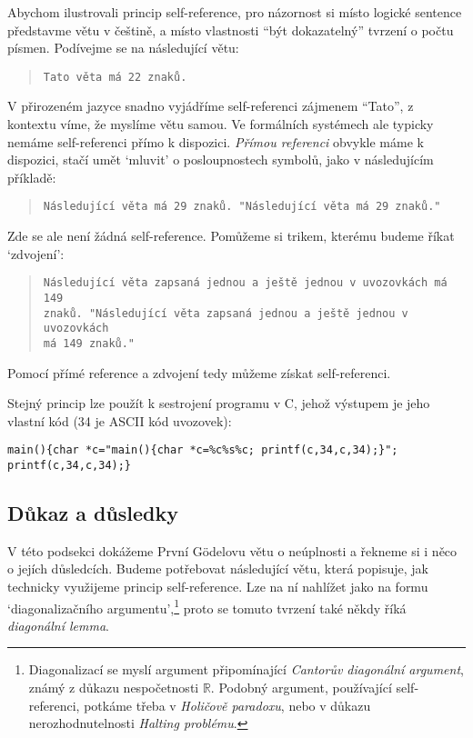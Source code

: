 Abychom ilustrovali princip self-reference, pro názornost si místo logické sentence představme větu v češtině, a místo vlastnosti ``být dokazatelný'' tvrzení o počtu písmen. Podívejme se na následující větu:
\begin{quote}
    \texttt{Tato věta má 22 znaků.}
\end{quote}
V přirozeném jazyce snadno vyjádříme self-referenci zájmenem ``Tato'', z kontextu víme, že myslíme větu samou. Ve formálních systémech ale typicky nemáme self-referenci přímo k dispozici. \emph{Přímou referenci} obvykle máme k dispozici, stačí umět `mluvit' o posloupnostech symbolů, jako v následujícím příkladě:
\begin{quote}
    \texttt{Následující věta má 29 znaků. "Následující věta má 29 znaků."}
\end{quote}
Zde se ale není žádná self-reference. Pomůžeme si trikem, kterému budeme říkat `zdvojení':
\begin{quote}
    \texttt{Následující věta zapsaná jednou a ještě jednou v uvozovkách má 149\\ znaků. "Následující věta zapsaná jednou a ještě jednou v uvozovkách\\ má 149 znaků."}
\end{quote}
Pomocí přímé reference a zdvojení tedy můžeme získat self-referenci.\begin{remark}
    Stejný princip lze použít k sestrojení programu v C, jehož výstupem je jeho vlastní kód (34 je ASCII kód uvozovek):    
{\small
\begin{verbatim}
main(){char *c="main(){char *c=%c%s%c; printf(c,34,c,34);}"; printf(c,34,c,34);}    
\end{verbatim}
}
\end{remark}


\subsection{Důkaz a důsledky}

V této podsekci dokážeme První Gödelovu větu o neúplnosti a řekneme si i něco o jejích důsledcích. Budeme potřebovat následující větu, která popisuje, jak technicky využijeme princip self-reference. Lze na ní nahlížet jako na formu `diagonalizačního argumentu',\footnote{Diagonalizací se myslí argument připomínající \emph{Cantorův diagonální argument}, známý z důkazu nespočetnosti $\mathbb R$. Podobný argument, používající self-referenci, potkáme třeba v \emph{Holičově paradoxu}, nebo v důkazu nerozhodnutelnosti \emph{Halting problému}.} proto se tomuto tvrzení také někdy říká \emph{diagonální lemma}.

